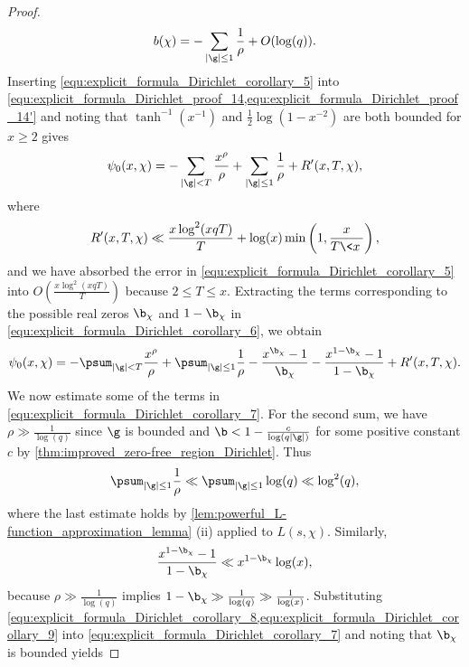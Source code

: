 \begin{proof}
      \begin{equation}\label{equ:explicit_formula_Dirichlet_corollary_5}
        b(\chi) = -\sum_{|\g| \le 1}\frac{1}{\rho}+O(\log(q)).
      \end{equation}
      Inserting \cref{equ:explicit_formula_Dirichlet_corollary_5} into \cref{equ:explicit_formula_Dirichlet_proof_14,equ:explicit_formula_Dirichlet_proof_14'} and noting that $\tanh^{-1}(x^{-1})$ and $\frac{1}{2}\log(1-x^{-2})$ are both bounded for $x \ge 2$ gives
      \begin{equation}\label{equ:explicit_formula_Dirichlet_corollary_6}
        \psi_{0}(x,\chi) = -\sum_{|\g| < T}\frac{x^{\rho}}{\rho}+\sum_{|\g| \le 1}\frac{1}{\rho}+R'(x,T,\chi),
      \end{equation}
      where
      \[
        R'(x,T,\chi) \ll \frac{x\log^{2}(xqT)}{T}+\log(x)\min\left(1,\frac{x}{T\<x\>}\right),
      \]
      and we have absorbed the error in \cref{equ:explicit_formula_Dirichlet_corollary_5} into $O\left(\frac{x\log^{2}(xqT)}{T}\right)$ because $2 \le T \le x$. Extracting the terms corresponding to the possible real zeros $\b_{\chi}$ and $1-\b_{\chi}$ in \cref{equ:explicit_formula_Dirichlet_corollary_6}, we obtain
      \begin{equation}\label{equ:explicit_formula_Dirichlet_corollary_7}
        \psi_{0}(x,\chi) = -\psum_{|\g| < T}\frac{x^{\rho}}{\rho}+\psum_{|\g| \le 1}\frac{1}{\rho}-\frac{x^{\b_{\chi}}-1}{\b_{\chi}}-\frac{x^{1-\b_{\chi}}-1}{1-\b_{\chi}}+R'(x,T,\chi).
      \end{equation}
      We now estimate some of the terms in \cref{equ:explicit_formula_Dirichlet_corollary_7}. For the second sum, we have $\rho \gg \frac{1}{\log(q)}$ since $\g$ is bounded and $\b < 1-\frac{c}{\log(q|\g|)}$ for some positive constant $c$ by \cref{thm:improved_zero-free_region_Dirichlet}. Thus
      \begin{equation}\label{equ:explicit_formula_Dirichlet_corollary_8}
        \psum_{|\g| \le 1}\frac{1}{\rho} \ll \psum_{|\g| \le 1}\log(q) \ll \log^{2}(q),
      \end{equation}
      where the last estimate holds by \cref{lem:powerful_L-function_approximation_lemma} (ii) applied to $L(s,\chi)$. Similarly,
      \begin{equation}\label{equ:explicit_formula_Dirichlet_corollary_9}
        \frac{x^{1-\b_{\chi}}-1}{1-\b_{\chi}} \ll x^{1-\b_{\chi}}\log(x),
      \end{equation}
      because $\rho \gg \frac{1}{\log(q)}$ implies $1-\b_{\chi} \gg \frac{1}{\log(q)} \gg \frac{1}{\log(x)}$. Substituting \cref{equ:explicit_formula_Dirichlet_corollary_8,equ:explicit_formula_Dirichlet_corollary_9} into \cref{equ:explicit_formula_Dirichlet_corollary_7} and noting that $\b_{\chi}$ is bounded yields

\end{proof}
